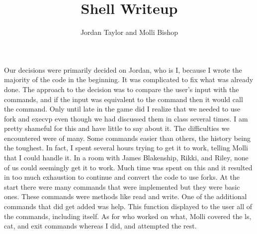 \documentclass[12pt,letterpaper,notitlepage]{report}
\title{Shell Writeup}
\author{Jordan Taylor and Molli Bishop}
\begin{document}
\maketitle
\begin{quad}
Our decisions were primarily decided on Jordan, who is I, because I wrote the majority of the code in the beginning. It was complicated to fix what was already done. The approach to the decision was to compare the user's input with the commands, and if the input was equivalent to the command then it would call the command. Only until late in the game did I realize that we needed to use fork and execvp even though we had discussed them in class several times. I am pretty shameful for this and have little to say about it. The difficulties we encountered were of many. Some commands easier than others, the history being the toughest. In fact, I spent several hours trying to get it to work, telling Molli that I could handle it. In a room with James Blakenship, Rikki, and Riley, none of us could seemingly get it to work. Much time was spent on this and it resulted in too much exhaustion to continue and convert the code to use forks. At the start there were many commands that were implemented but they were basic ones. These commands were methods like read and write. One of the additional commands that did get added was help. This function displayed to the user all of the commands, including itself. As for who worked on what, Molli covered the ls, cat, and exit commands whereas I did, and attempted the rest.
\newline
\end{quad}
\end{document}
